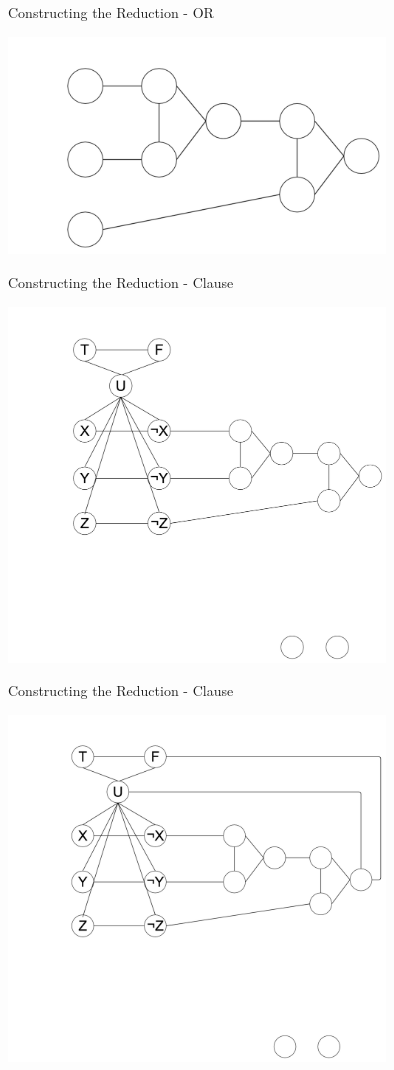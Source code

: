\documentclass[bigger]{beamer}
\begin{document}
\begin{frame}[label=sec-11]{Constructing the Reduction - OR}
\begin{center}
\includegraphics[width=10cm]{Or2.png}
\end{center}
\end{frame}

\begin{frame}[label=sec-12]{Constructing the Reduction - Clause}
\begin{center}
\includegraphics[width=10cm]{Comb1.png}
\end{center}
\end{frame}

\begin{frame}[label=sec-13]{Constructing the Reduction - Clause}
\begin{center}
\includegraphics[width=10cm]{Comb2.png}
\end{center}
\end{frame}
\end{document}
